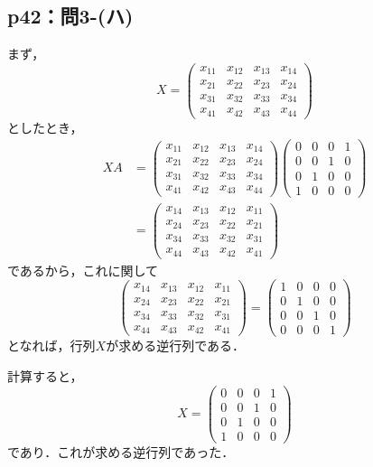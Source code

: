 \documentclass[a4paper,10pt,fleqn]{ltjsarticle}
\begin{document}
\subsection*{p42：問3-(ハ)}

\begin{tleftbar}
  まず，
  \[
    X= \begin{pmatrix} x_{11} & x_{12} & x_{13} & x_{14}\\x_{21} & x_{22} & x_{23} & x_{24} \\x_{31} & x_{32} & x_{33} & x_{34} \\x_{41} & x_{42} & x_{43} & x_{44} \end{pmatrix}
  \]
  としたとき，
  \begin{align*}
    XA & = \begin{pmatrix} x_{11} & x_{12} & x_{13} & x_{14}\\x_{21} & x_{22} & x_{23} & x_{24} \\x_{31} & x_{32} & x_{33} & x_{34} \\x_{41} & x_{42} & x_{43} & x_{44} \end{pmatrix}
    \begin{pmatrix} 0 & 0 & 0 & 1 \\ 0 & 0 & 1 & 0 \\ 0 & 1 & 0 & 0 \\ 1 & 0 & 0 & 0 \end{pmatrix}                                                                                     \\
       & = \begin{pmatrix} x_{14} & x_{13} & x_{12} & x_{11} \\x_{24} & x_{23} & x_{22} & x_{21} \\x_{34} & x_{33} & x_{32} & x_{31} \\x_{44} & x_{43} & x_{42} & x_{41} \end{pmatrix}
  \end{align*}
  であるから，これに関して
  \[
    \begin{pmatrix} x_{14} & x_{13} & x_{12} & x_{11} \\x_{24} & x_{23} & x_{22} & x_{21} \\x_{34} & x_{33} & x_{32} & x_{31} \\x_{44} & x_{43} & x_{42} & x_{41} \end{pmatrix} = \begin{pmatrix} 1 & 0 & 0 & 0 \\ 0 & 1 & 0 & 0 \\ 0 & 0 & 1 & 0 \\ 0 & 0 & 0 & 1 \end{pmatrix}
  \]
  となれば，行列$X$が求める逆行列である．

  計算すると，
  \[
    X = \begin{pmatrix} 0 & 0 & 0 & 1 \\ 0 & 0 & 1 & 0 \\ 0 & 1 & 0 & 0 \\ 1 & 0 & 0 & 0 \end{pmatrix}
  \]
  であり．これが求める逆行列であった．
\end{tleftbar}
\end{document}
